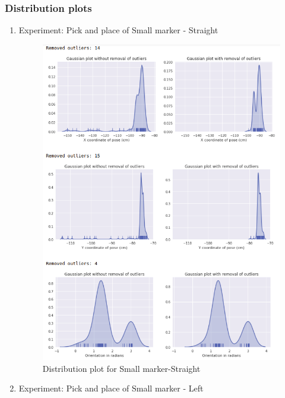 \documentclass[11pt,a4paper]{article}
\begin{document}
				\subsubsection{Distribution plots}
				\begin{enumerate}
				\item Experiment: Pick and place of Small marker - Straight
				\begin{figure}[H]
					\centering
					\includegraphics[scale=0.58]{small-str}	
					\caption{Distribution plot for Small marker-Straight}
				\end{figure}
				\newpage
				\item Experiment: Pick and place of Small marker - Left
				\begin{figure}[H]
					\centering

\end{figure}
\end{enumerate}
\end{document}
